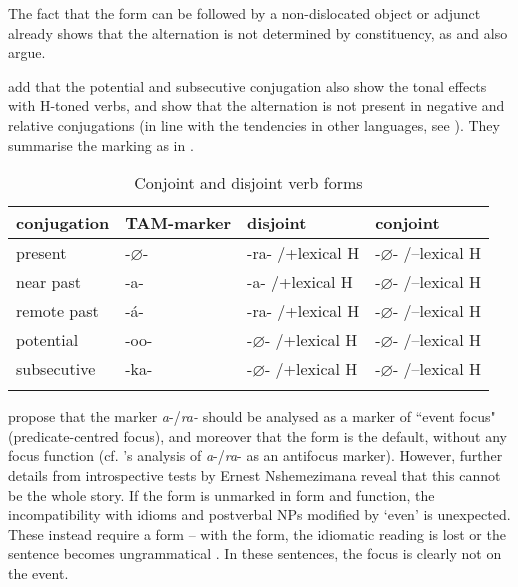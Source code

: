 \documentclass[output=paper]{langscibook}
\begin{document}
\z
\z


The fact that the \DJ{} form can be followed by a non-dislocated object or adjunct already shows that the alternation is not determined by constituency, as \citet{NshemezimanaBostoen2017} and \citet{Nshemezimana2016} also argue. 

\citet[397]{NshemezimanaBostoen2017} add that the potential and subsecutive conjugation also show the tonal effects with H-toned verbs, and show that the alternation is not present in negative and relative conjugations (in line with the tendencies in other languages, see \citealt{vanderWal2017}). They summarise the marking as in .

\begin{table}
\begin{tabularx}{\textwidth}{XlXX}
\lsptoprule
conjugation & TAM-marker & disjoint & conjoint\\
\midrule
present & -$\varnothing$- & -ra- /+lexical H & -$\varnothing$- /--lexical H\\
near past & -a- & -a- /+lexical H & -$\varnothing$- /--lexical H\\
remote past & -á- & -ra- /+lexical H & -$\varnothing$- /--lexical H\\
potential & -oo- & -$\varnothing$- /+lexical H & -$\varnothing$- /--lexical H\\
subsecutive & -ka- & -$\varnothing$- /+lexical H & -$\varnothing$- /--lexical H\\
\lspbottomrule
\end{tabularx}
\caption{Conjoint and disjoint verb forms \citep[397]{NshemezimanaBostoen2017}}
\label{tab:run-cjdjforms}
\end{table}


\citeauthor{NshemezimanaBostoen2017} propose that the \DJ{} marker \textit{a}-/\textit{ra-} should be analysed as a marker of ``event focus" (predicate-centred focus), and moreover that the \CJ{} form is the default, without any focus function (cf. \citeauthor{Ndayiragije1999}'s \citeyear{Ndayiragije1999} analysis of \textit{a}-/\textit{ra}- as an antifocus marker). However, further details from introspective tests by Ernest Nshemezimana reveal that this cannot be the whole story. If the \CJ{} form is unmarked in form and function, the incompatibility with idioms and postverbal NPs modified by ‘even’ is unexpected. These instead require a \DJ{} form – with the \CJ{} form, the idiomatic reading is lost  or the sentence becomes ungrammatical . In these sentences, the focus is clearly not on the event.
\end{document}
